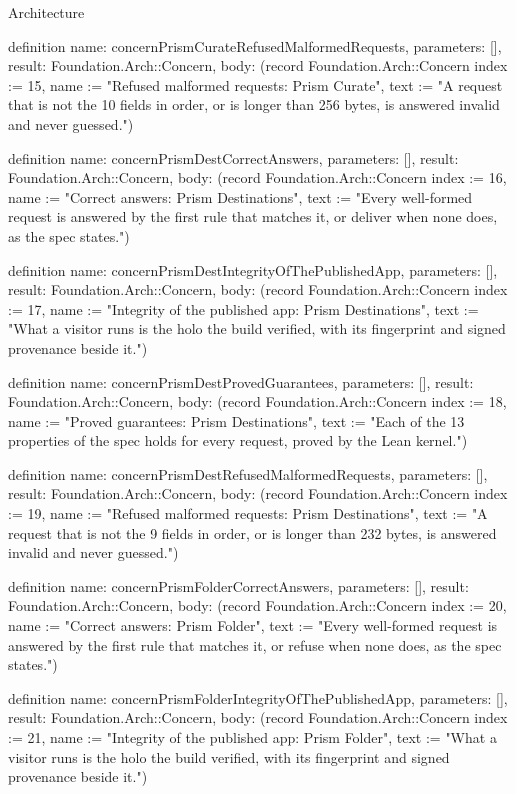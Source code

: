 \begin{lexlean}{Architecture}
\begin{semanticmodule}
definition{
  name: concernPrismCurateRefusedMalformedRequests,
  parameters: [],
  result: Foundation.Arch::Concern,
  body: (record Foundation.Arch::Concern {index := 15, name := "Refused malformed requests: Prism Curate", text := "A request that is not the 10 fields in order, or is longer than 256 bytes, is answered invalid and never guessed."})
}

definition{
  name: concernPrismDestCorrectAnswers,
  parameters: [],
  result: Foundation.Arch::Concern,
  body: (record Foundation.Arch::Concern {index := 16, name := "Correct answers: Prism Destinations", text := "Every well-formed request is answered by the first rule that matches it, or deliver when none does, as the spec states."})
}

definition{
  name: concernPrismDestIntegrityOfThePublishedApp,
  parameters: [],
  result: Foundation.Arch::Concern,
  body: (record Foundation.Arch::Concern {index := 17, name := "Integrity of the published app: Prism Destinations", text := "What a visitor runs is the holo the build verified, with its fingerprint and signed provenance beside it."})
}

definition{
  name: concernPrismDestProvedGuarantees,
  parameters: [],
  result: Foundation.Arch::Concern,
  body: (record Foundation.Arch::Concern {index := 18, name := "Proved guarantees: Prism Destinations", text := "Each of the 13 properties of the spec holds for every request, proved by the Lean kernel."})
}

definition{
  name: concernPrismDestRefusedMalformedRequests,
  parameters: [],
  result: Foundation.Arch::Concern,
  body: (record Foundation.Arch::Concern {index := 19, name := "Refused malformed requests: Prism Destinations", text := "A request that is not the 9 fields in order, or is longer than 232 bytes, is answered invalid and never guessed."})
}

definition{
  name: concernPrismFolderCorrectAnswers,
  parameters: [],
  result: Foundation.Arch::Concern,
  body: (record Foundation.Arch::Concern {index := 20, name := "Correct answers: Prism Folder", text := "Every well-formed request is answered by the first rule that matches it, or refuse when none does, as the spec states."})
}

definition{
  name: concernPrismFolderIntegrityOfThePublishedApp,
  parameters: [],
  result: Foundation.Arch::Concern,
  body: (record Foundation.Arch::Concern {index := 21, name := "Integrity of the published app: Prism Folder", text := "What a visitor runs is the holo the build verified, with its fingerprint and signed provenance beside it."})
}


\end{semanticmodule}
\end{lexlean}
